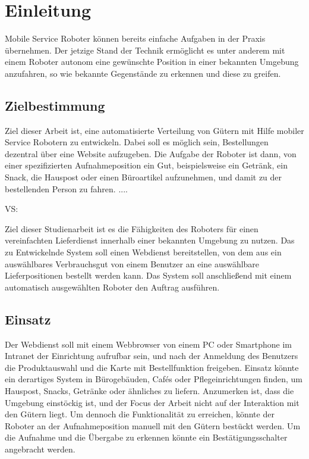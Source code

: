 %
%
\chapter{Einleitung}

Mobile Service Roboter können bereits einfache Aufgaben in der Praxis übernehmen.
Der jetzige Stand der Technik ermöglicht es unter anderem mit einem Roboter autonom eine gewünschte Position in einer bekannten Umgebung anzufahren,
so wie bekannte Gegenstände zu erkennen und diese zu greifen.
\section{Zielbestimmung}
\vspace{0pt}
Ziel dieser Arbeit ist, eine automatisierte Verteilung von Gütern mit Hilfe mobiler Service Robotern zu entwickeln.
Dabei soll es möglich sein, Bestellungen dezentral über eine Website aufzugeben.
Die Aufgabe der Roboter ist dann, von einer spezifizierten Aufnahmeposition ein Gut, beispielsweise ein Getränk, ein Snack, die Hauspost oder einen Büroartikel aufzunehmen,
und damit zu der bestellenden Person zu fahren. ....

VS:

Ziel dieser Studienarbeit ist es die Fähigkeiten des Roboters für einen vereinfachten Lieferdienst innerhalb einer bekannten Umgebung zu nutzen.
Das zu Entwickelnde System soll einen Webdienst bereitstellen, von dem aus ein auswählbares Verbrauchsgut von einem Benutzer an eine auswählbare Lieferpositionen bestellt werden kann.
Das System soll anschließend mit einem automatisch ausgewählten Roboter den Auftrag ausführen.
\section{Einsatz}
Der Webdienst soll mit einem Webbrowser von einem PC oder Smartphone im Intranet der Einrichtung aufrufbar sein, und nach der Anmeldung des Benutzers die Produktauswahl und die Karte mit Bestellfunktion freigeben.
Einsatz könnte ein derartiges System in Bürogebäuden, Cafés oder Pflegeinrichtungen finden, um Hauspost, Snacks, Getränke oder ähnliches zu liefern.
Anzumerken ist, dass die Umgebung einstöckig ist, und der Focus der Arbeit nicht auf der Interaktion mit den Gütern liegt.
Um dennoch die Funktionalität zu erreichen, könnte der Roboter an der Aufnahmeposition manuell mit den Gütern bestückt werden.
Um die Aufnahme und die Übergabe zu erkennen könnte ein Bestätigungsschalter angebracht werden.

